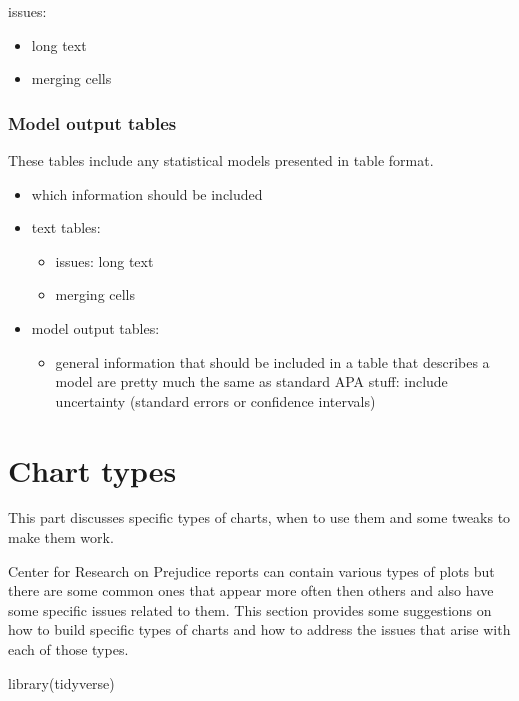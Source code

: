 \documentclass[
  letterpaper,
  DIV=11,
  numbers=noendperiod]{scrreprt}
\newenvironment{Shaded}{\begin{snugshade}}{\end{snugshade}}
\newcommand{\FunctionTok}[1]{\textcolor[rgb]{0.28,0.35,0.67}{#1}}
\newcommand{\NormalTok}[1]{\textcolor[rgb]{0.00,0.23,0.31}{#1}}
\providecommand{\tightlist}{%
  \setlength{\itemsep}{0pt}\setlength{\parskip}{0pt}}\usepackage{longtable,booktabs,array}
\begin{document}
issues:

\begin{itemize}
\item
  long text
\item
  merging cells
\end{itemize}

\subsection{Model output tables}\label{model-output-tables}

These tables include any statistical models presented in table format.

\begin{itemize}
\item
  which information should be included
\item
  text tables:

  \begin{itemize}
  \item
    issues: long text
  \item
    merging cells
  \end{itemize}
\item
  model output tables:

  \begin{itemize}
  \tightlist
  \item
    general information that should be included in a table that
    describes a model are pretty much the same as standard APA stuff:
    include uncertainty (standard errors or confidence intervals)
  \end{itemize}
\end{itemize}


\chapter{Chart types}\label{chart-types}

This part discusses specific types of charts, when to use them and some
tweaks to make them work.

Center for Research on Prejudice reports can contain various types of
plots but there are some common ones that appear more often then others
and also have some specific issues related to them. This section
provides some suggestions on how to build specific types of charts and
how to address the issues that arise with each of those types.

\begin{Shaded}
\begin{Highlighting}[]
\FunctionTok{library}\NormalTok{(tidyverse)}
\end{Highlighting}
\end{Shaded}
\end{document}
